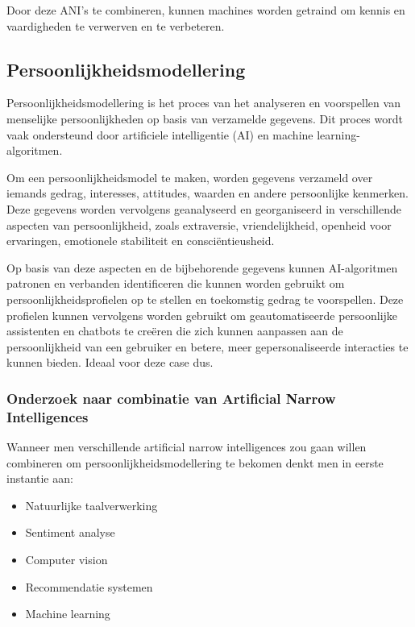 Door deze ANI's te combineren, kunnen machines worden getraind om kennis en vaardigheden te verwerven en te verbeteren.

\subsection{Persoonlijkheidsmodellering}

Persoonlijkheidsmodellering is het proces van het analyseren en voorspellen van menselijke persoonlijkheden op basis van verzamelde gegevens. Dit proces wordt vaak ondersteund door artificiele intelligentie (AI) en machine learning-algoritmen.

Om een persoonlijkheidsmodel te maken, worden gegevens verzameld over iemands gedrag, interesses, attitudes, waarden en andere persoonlijke kenmerken. Deze gegevens worden vervolgens geanalyseerd en georganiseerd in verschillende aspecten van persoonlijkheid, zoals extraversie, vriendelijkheid, openheid voor ervaringen, emotionele stabiliteit en consciëntieusheid.

Op basis van deze aspecten en de bijbehorende gegevens kunnen AI-algoritmen patronen en verbanden identificeren die kunnen worden gebruikt om persoonlijkheidsprofielen op te stellen en toekomstig gedrag te voorspellen. Deze profielen kunnen vervolgens worden gebruikt om geautomatiseerde persoonlijke assistenten en chatbots te creëren die zich kunnen aanpassen aan de persoonlijkheid van een gebruiker en betere, meer gepersonaliseerde interacties te kunnen bieden. Ideaal voor deze case dus.

\subsubsection{Onderzoek naar combinatie van Artificial Narrow Intelligences}

Wanneer men verschillende artificial narrow intelligences zou gaan willen combineren om persoonlijkheidsmodellering te bekomen denkt men in eerste instantie aan:

\begin{itemize}
    \item Natuurlijke taalverwerking
    \item Sentiment analyse
    \item Computer vision
    \item Recommendatie systemen
    \item Machine learning
\end{itemize}

